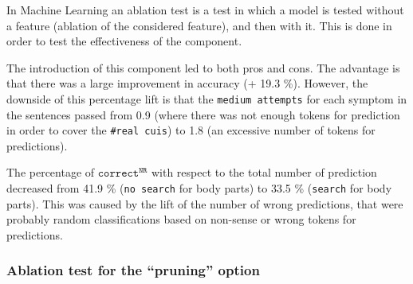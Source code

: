 
In Machine Learning an ablation test is a test in which a model is tested without a feature (ablation of the considered feature), and then with it. This is done in order to test the effectiveness of the component.

The introduction of this component led to both pros and cons. The advantage is that there was a large improvement in accuracy (+ 19.3 \%). However, the downside of this percentage lift is that the \texttt{medium attempts} for each symptom in the sentences passed from 0.9 (where there was not enough tokens for prediction in order to cover the \texttt{\#real cuis}) to 1.8 (an excessive number of tokens for predictions).

The percentage of $\texttt{correct}^{\texttt{NR}}$ with respect to the total number of prediction decreased from 41.9 \% (\texttt{no search} for body parts) to 33.5 \% (\texttt{search} for body parts). This was caused by the lift of the number of wrong predictions, that were probably random classifications based on non-sense or wrong tokens for predictions. %


\newpage
\subsubsection{Ablation test for the ``pruning'' option}

